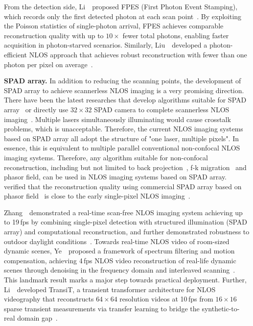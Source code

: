 From the detection side, Li~\etal~proposed FPES (First Photon Event Stamping), which records only the first detected photon at each scan point~\cite{liFastFirstPhoton2022}. By exploiting the Poisson statistics of single-photon arrival, FPES achieves comparable reconstruction quality with up to $10\times$ fewer total photons, enabling faster acquisition in photon-starved scenarios. Similarly, Liu~\etal~developed a photon-efficient NLOS approach that achieves robust reconstruction with fewer than one photon per pixel on average~\cite{liuPhotonEfficientNLOS2022}.

\vspace{0.8mm}
\noindent \textbf{SPAD array.}
In addition to reducing the scanning points, the development of SPAD array to achieve scannerless NLOS imaging is a very promising direction. There have been the latest researches that develop algorithms suitable for SPAD array~\cite{liuPhasorFieldDiffraction2020,nam_real-time_2020} or directly use  $32\times 32$ SPAD camera to complete scannerless NLOS imaging~\cite{jinScannerlessNonlineofsightThree2020}.
Multiple lasers simultaneously illuminating would cause crosstalk problems, which is unacceptable. Therefore, the current NLOS imaging systems based on SPAD array all adopt the structure of "one laser, multiple pixels". In essence, this is equivalent to multiple parallel conventional non-confocal NLOS imaging systems. Therefore, any algorithm suitable for non-confocal reconstruction, including but not limited to back projection~\cite{arellanoFastBackprojectionNonline2017}, f-k migration~\cite{Lindell:2019:Wave} and phasor field, can be used in NLOS imaging systems based on SPAD array.~\cite{jinScannerlessNonlineofsightThree2020} verified that the reconstruction quality using commercial SPAD array based on phasor field~\cite{liuPhasorFieldDiffraction2020} is close to the early single-pixel NLOS imaging~\cite{veltenRecoveringThreedimensionalShape2012}.

Zhang~\etal~demonstrated a real-time scan-free NLOS imaging system achieving up to 19\,fps by combining single-pixel detection with structured illumination (SPAD array) and computational reconstruction, and further demonstrated robustness to outdoor daylight conditions~\cite{zhangRealTimeScanFree2024}. Towards real-time NLOS video of room-sized dynamic scenes, Ye~\etal~proposed a framework of spectrum filtering and motion compensation, achieving 4\,fps NLOS video reconstruction of real-life dynamic scenes through denoising in the frequency domain and interleaved scanning~\cite{yeRealTimeNLOS2024}. This landmark result marks a major step towards practical deployment. Further, Li~\etal~developed TransiT, a transient transformer architecture for NLOS videography that reconstructs $64\times64$ resolution videos at 10\,fps from $16\times16$ sparse transient measurements via transfer learning to bridge the synthetic-to-real domain gap~\cite{liTransiT2025}.

